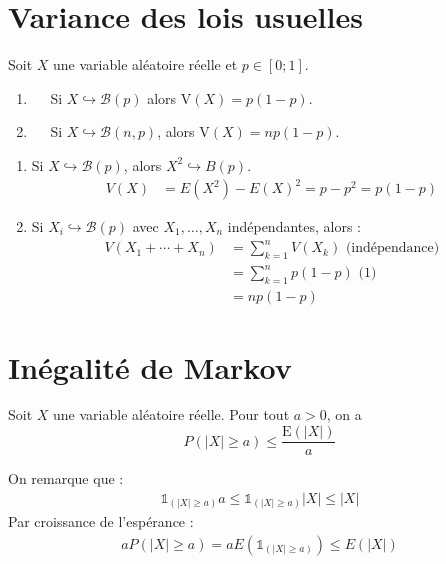 \documentclass[../main.tex]{subfiles}
\begin{document}
\section{Variance des lois usuelles}
\begin{tcolorbox}[title=Théorème 33.16, title filled=false, colframe=orange, colback=orange!10!white]
    Soit $X$ une variable aléatoire réelle et $p \in[0 ; 1]$.
    \begin{enumerate}
        \item $\quad$ Si $X \hookrightarrow \mathcal{B}(p)$ alors $\mathrm{V}(X)=p(1-p)$.
        \item $\quad$ Si $X \hookrightarrow \mathcal{B}(n, p)$, alors $\mathrm{V}(X)=n p(1-p)$.
    \end{enumerate}
\end{tcolorbox}

\begin{enumerate}
    \item Si $X \hookrightarrow \mathcal{B}(p)$, alors $X^2\hookrightarrow B(p)$. 
    \begin{align*}
        V(X) &= E(X^2) - E(X)^2 = p - p^2 = p(1-p)
    \end{align*}
    \item Si $X_i\hookrightarrow \mathcal{B}(p)$ avec $X_1, \ldots, X_n$ indépendantes, alors : 
    \begin{align*}
        V(X_1 + \cdots + X_n) &= \sum_{k=1}^{n} V(X_k) \text{ (indépendance)} \\
        &= \sum_{k=1}^{n} p(1-p) \text{ (1)} \\
        &= np(1-p)
    \end{align*}
\end{enumerate}

\section{Inégalité de Markov}
\begin{tcolorbox}[title=Théorème 33.17, title filled=false, colframe=orange, colback=orange!10!white]
    Soit $X$ une variable aléatoire réelle. Pour tout $a>0$, on a
    $$P(|X| \geq a) \leq \frac{\mathrm{E}(|X|)}{a}$$
\end{tcolorbox}

\noindent On remarque que : 
\begin{align*}
    \mathbb{1}_{(|X|\geq a)} a \leq \mathbb{1}_{(|X|\geq a)}|X| \leq |X|
\end{align*}
Par croissance de l'espérance : 
\begin{align*}
    a P(|X|\geq a) = a E(\mathbb{1}_{(|X|\geq a)}) \leq E(|X|)
\end{align*}
\end{document}
